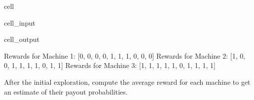 \documentclass[letterpaper,10pt,english]{jupyterBook}
\begin{document}
\begin{sphinxuseclass}{cell}
\begin{sphinxVerbatimInput}
\begin{sphinxuseclass}{cell_input}
\end{sphinxuseclass}\end{sphinxVerbatimInput}
\begin{sphinxVerbatimOutput}

\begin{sphinxuseclass}{cell_output}
\begin{sphinxVerbatim}[commandchars=\\\{\}]
Rewards for Machine 1: [0, 0, 0, 0, 1, 1, 1, 0, 0, 0]
Rewards for Machine 2: [1, 0, 0, 1, 1, 1, 1, 0, 1, 1]
Rewards for Machine 3: [1, 1, 1, 1, 1, 0, 1, 1, 1, 1]
\end{sphinxVerbatim}

\end{sphinxuseclass}\end{sphinxVerbatimOutput}

\end{sphinxuseclass}
\sphinxAtStartPar
{}

\sphinxAtStartPar
After the initial exploration, compute the average reward for each machine to get an estimate of their payout probabilities.
\end{document}
